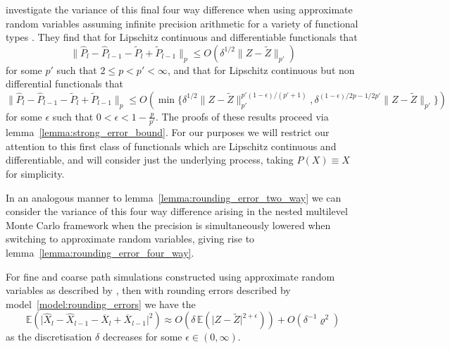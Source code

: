 \documentclass[manuscript,review]{acmart}
\begin{document}
\citet{giles2020approximate,giles2020approximating} investigate the variance of this final four way difference when using approximate random variables assuming infinite precision arithmetic for a variety of functional types \citep[lemmas~4.10 and 4.11]{giles2020approximate} \citep[corollaries~6.2.6.2 and 6.2.6.3]{sheridan2020nested}. They find that for Lipschitz continuous and differentiable functionals that 
\begin{equation*}
\lVert \widehat{P}_l - \widehat{P}_{l-1} - \widetilde{P}_l + \widetilde{P}_{l-1}\rVert_p 
\leq O(\delta^{1/2} \lVert Z - \widetilde{Z} \rVert_{p'}) 
\end{equation*}
for some  $ p' $ such that $ 2 \leq p < p' < \infty $, and that for Lipschitz continuous but non differential functionals that 
\begin{equation*}
\lVert \widehat{P}_l - \widehat{P}_{l-1} - \widetilde{P}_l + \widetilde{P}_{l-1}\rVert_p
\leq O(\min\{
\delta^{1/2} \lVert Z - \widetilde{Z} \rVert_{p'}^{p'(1-\epsilon)/(p'+1)},
\delta^{(1-\epsilon)/2p -1/2p'}    \lVert Z - \widetilde{Z} \rVert_{p'}
\})
\end{equation*}
for some  $ \epsilon $ such that $ 0<\epsilon<1 - \tfrac{p}{p'} $. The proofs of these results proceed via lemma~\ref{lemma:strong_error_bound}. For our purposes we will restrict our attention to this first class of functionals which are Lipschitz continuous and differentiable, and will consider just the underlying process, taking $ P(X)\equiv X $ for simplicity. 

In an analogous manner to lemma~\ref{lemma:rounding_error_two_way} we can consider the variance of this four way difference arising in the nested multilevel Monte Carlo framework when the precision is simultaneously lowered when switching to approximate random variables, giving rise to lemma~\ref{lemma:rounding_error_four_way}.

\begin{lemma}
\label{lemma:rounding_error_four_way}
For fine and coarse path simulations constructed using approximate random variables as described by \citet{giles2020approximate}, then with rounding errors described by model~\ref{model:rounding_errors} we have the 
\begin{equation*}
\mathbb{E}(\lvert \widehat{X}_l - \widehat{X}_{l-1} - \overline{X}_l + \overline{X}_{l-1}\rvert^2) 
\approx O(\delta\, \mathbb{E}(\lvert Z - \widetilde{Z} \rvert^{2 + \epsilon})) + O(\delta^{-1}\varrho^2) 
\end{equation*}
as the discretisation $ \delta $ decreases for some $ \epsilon \in (0, \infty)$.
\end{lemma}
\end{document}
